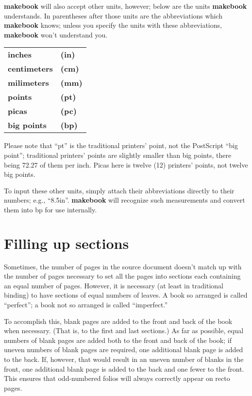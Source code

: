 \documentclass[12pt,twoside,final]{extarticle}
\begin{document}
\textbf{makebook} will also accept other units, however; below are the units \textbf{makebook} understands. In parentheses after those units are the abbreviations which \textbf{makebook} knows; unless you specify the units with these abbreviations, \textbf{makebook} won't understand you. \\

\begin{tabular}{ll}
\textbf{inches} & \textbf{(in)} \\
\textbf{centimeters} & \textbf{(cm)} \\
\textbf{milimeters} & \textbf{(mm)} \\
\textbf{points} & \textbf{(pt)} \\
\textbf{picas} & \textbf{(pc)} \\
\textbf{big points} & \textbf{(bp)} \\
\end{tabular}
\vspace{12pt}

Please note that ``pt'' is the traditional printers' point, not the PostScript ``big point''; traditional printers' points are slightly smaller than big points, there being 72.27 of them per inch. Picas here is twelve (12) printers' points, not twelve big points.

To  input these other units, simply attach their abbreviations directly to their numbers; e.g., ``8.5in''. \textbf{makebook} will recognize such measurements and convert them into bp for use internally.
\section{Filling up sections}
Sometimes, the number of pages in the source document doesn't match up with the number of pages necessary to set all  the  pages  into  sections each containing an equal number of pages. However, it is necessary (at least in traditional binding) to have sections of equal numbers of leaves. A book so arranged  is  called  ``perfect'';  a book not so arranged is called ``imperfect.''

To accomplish this, blank pages are added to the front and back of the book when necessary. (That is, to the first and last sections.) As far as possible, equal numbers of blank pages are added both to the front and back of the book; if uneven numbers of blank pages are required, one additional blank page is added to the back.  If, however, that would result in an uneven number of blanks in the front, one additional blank page is added to the back  and  one  fewer to the front. This ensures that odd-numbered folios will always correctly appear on recto pages.
\end{document}
